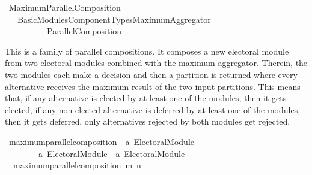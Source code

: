 %
\begin{isabellebody}%
%
%
\isadelimdocument
\isanewline
%
\endisadelimdocument
%
\isatagdocument
\isanewline
\isanewline
%
\isamarkuptrue%
%
\endisatagdocument
{\isafolddocument}%
%
\isadelimdocument
%
\endisadelimdocument
%
\isadelimtheory
%
\endisadelimtheory
%
\isatagtheory
{}\isamarkupfalse%
\ Maximum{\isacharunderscore}{\kern0pt}Parallel{\isacharunderscore}{\kern0pt}Composition\isanewline
\ \ \ {\isachardoublequoteopen}Basic{\isacharunderscore}{\kern0pt}Modules{\isacharslash}{\kern0pt}Component{\isacharunderscore}{\kern0pt}Types{\isacharslash}{\kern0pt}Maximum{\isacharunderscore}{\kern0pt}Aggregator{\isachardoublequoteclose}\isanewline
\ \ \ \ \ \ \ \ \ \ Parallel{\isacharunderscore}{\kern0pt}Composition\isanewline
{}%
\endisatagtheory
{\isafoldtheory}%
%
\isadelimtheory
%
\endisadelimtheory
%
\begin{isamarkuptext}%
This is a family of parallel compositions. It composes a new electoral module
from two electoral modules combined with the maximum aggregator. Therein, the
two modules each make a decision and then a partition is returned where every
alternative receives the maximum result of the two input partitions. This means
that, if any alternative is elected by at least one of the modules, then it
gets elected, if any non-elected alternative is deferred by at least one of the
modules, then it gets deferred, only alternatives rejected by both modules get
rejected.%
\end{isamarkuptext}\isamarkuptrue%
%
\isadelimdocument
%
\endisadelimdocument
%
\isatagdocument
%
\isamarkuptrue%
%
\endisatagdocument
{\isafolddocument}%
%
\isadelimdocument
%
\endisadelimdocument
{}\isamarkupfalse%
\ maximum{\isacharunderscore}{\kern0pt}parallel{\isacharunderscore}{\kern0pt}composition\ {\isacharcolon}{\kern0pt}{\isacharcolon}{\kern0pt}\ {\isachardoublequoteopen}{\isacharprime}{\kern0pt}a\ Electoral{\isacharunderscore}{\kern0pt}Module\ {\isasymRightarrow}\isanewline
\ \ \ \ \ \ \ \ {\isacharprime}{\kern0pt}a\ Electoral{\isacharunderscore}{\kern0pt}Module\ {\isasymRightarrow}\ {\isacharprime}{\kern0pt}a\ Electoral{\isacharunderscore}{\kern0pt}Module{\isachardoublequoteclose}\ \isanewline
\ \ {\isachardoublequoteopen}maximum{\isacharunderscore}{\kern0pt}parallel{\isacharunderscore}{\kern0pt}composition\ m\ n\ {\isacharequal}{\kern0pt}\isanewline

\end{isabellebody}
